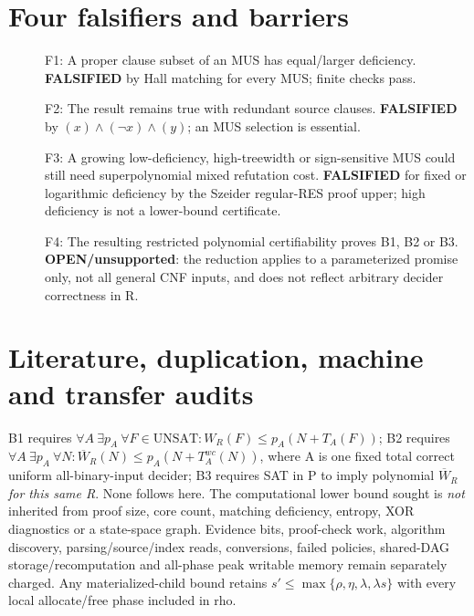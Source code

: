 \documentclass[11pt]{article}
\begin{document}
\section*{Four falsifiers and barriers}
\begin{description}
\item[] F1: A proper clause subset of an MUS has equal/larger deficiency. \textbf{FALSIFIED} by Hall matching for every MUS; finite checks pass.
\item[] F2: The result remains true with redundant source clauses. \textbf{FALSIFIED} by $(x)\wedge(\neg x)\wedge(y)$; an MUS selection is essential.
\item[] F3: A growing low-deficiency, high-treewidth or sign-sensitive MUS could still need superpolynomial mixed refutation cost. \textbf{FALSIFIED} for fixed or logarithmic deficiency by the Szeider regular-RES proof upper; high deficiency is not a lower-bound certificate.
\item[] F4: The resulting restricted polynomial certifiability proves B1, B2 or B3. \textbf{OPEN/unsupported}: the reduction applies to a parameterized promise only, not all general CNF inputs, and does not reflect arbitrary decider correctness in R.
\end{description}

\section*{Literature, duplication, machine and transfer audits}
\noindent B1 requires $\forall A\ \exists p_A\ \forall F\in\mathrm{UNSAT}:W_R(F)\le p_A(N+T_A(F))$; B2 requires $\forall A\ \exists p_A\ \forall N:\overline W_R(N)\le p_A(N+T_A^{wc}(N))$, where A is one fixed total correct uniform all-binary-input decider; B3 requires SAT in P to imply polynomial $\overline W_R$ \emph{for this same R}. None follows here. The computational lower bound sought is \emph{not} inherited from proof size, core count, matching deficiency, entropy, XOR diagnostics or a state-space graph. Evidence bits, proof-check work, algorithm discovery, parsing/source/index reads, conversions, failed policies, shared-DAG storage/recomputation and all-phase peak writable memory remain separately charged. Any materialized-child bound retains $s'\le\max\{\rho,\eta,\lambda,\lambda s\}$ with every local allocate/free phase included in rho.
\end{document}
